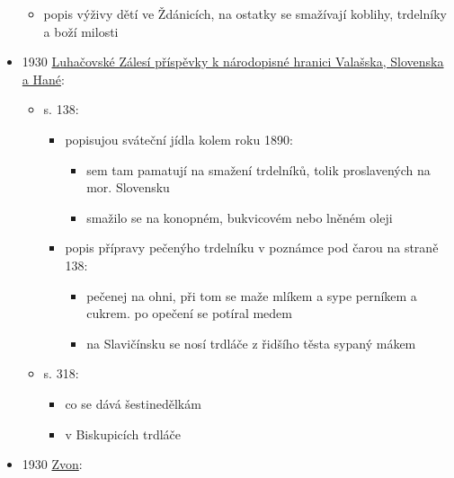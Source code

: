 \begin{itemize}
  \begin{itemize}
  \tightlist
  \item
    popis výživy dětí ve Ždánicích, na ostatky se smažívají koblihy,
    trdelníky a boží milosti
  \end{itemize}
\item
  1930
  \href{https://ndk.cz/view/uuid:2d9fa8a0-5063-11e4-8344-005056827e52?page=uuid:1b35e0b0-77b1-11e4-9605-005056825209&fulltext=trdeln\%C3\%ADk\%C5\%AF}{Luhačovské
  Zálesí příspěvky k národopisné hranici Valašska, Slovenska a Hané}:

  \begin{itemize}
  \tightlist
  \item
    s. 138:

    \begin{itemize}
    \tightlist
    \item
      popisujou sváteční jídla kolem roku 1890:

      \begin{itemize}
      \tightlist
      \item
        sem tam pamatují na smažení trdelníků, tolik proslavených na
        mor. Slovensku
      \item
        smažilo se na konopném, bukvicovém nebo lněném oleji
      \end{itemize}
    \item
      popis přípravy pečenýho trdelníku v poznámce pod čarou na straně
      138:

      \begin{itemize}
      \tightlist
      \item
        pečenej na ohni, při tom se maže mlíkem a sype perníkem a
        cukrem. po opečení se potíral medem
      \item
        na Slavičínsku se nosí trdláče z řidšího těsta sypaný mákem
      \end{itemize}
    \end{itemize}
  \item
    s. 318:

    \begin{itemize}
    \tightlist
    \item
      co se dává šestinedělkám
    \item
      v Biskupicích trdláče
    \end{itemize}
  \end{itemize}
\item
  1930
  \href{https://ceskadigitalniknihovna.cz/view/uuid:962edf50-9004-11e3-83a0-005056825209?page=uuid\%3Ac58d1770-9613-11e3-8b69-005056825209&fulltext=trdeln\%C3\%ADk\%20OR\%20trdeln\%C3\%ADky\%20OR\%20trdeln\%C3\%ADk\%C5\%AF&source=mzk}{Zvon}:


\end{itemize}
